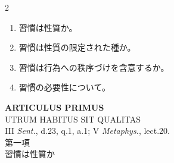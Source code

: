 \documentclass[paper=a4paper,fontsize=10pt,jafontsize=9pt,titlepage]{jlreq}
\begin{document}
\begin{paracol}{2}
\begin{enumerate}
 \item 習慣は性質か。
 \item 習慣は性質の限定された種か。
 \item 習慣は行為への秩序づけを含意するか。
 \item 習慣の必要性について。
\end{enumerate}

\end{paracol}

\newpage
{}
{}
\setcounter{section}{1}
\setcounter{subsection}{0}
\begin{center}
{\Large {\bfseries ARTICULUS PRIMUS}}\\
{\large UTRUM HABITUS SIT QUALITAS}\\
{\footnotesize III {\itshape Sent.}, d.23, q.1, a.1; V {\itshape
 Metaphys.}, lect.20.}\\
{\Large 第一項\\習慣は性質か}
\end{center}
\end{document}
